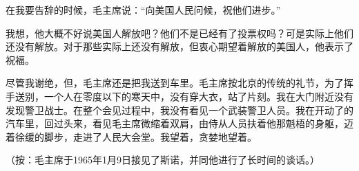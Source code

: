 在我要告辞的时候，毛主席说：“向美国人民问候，祝他们进步。”

我想，他大概不好说美国人解放吧？他们不是已经有了投票权吗？可是实际上他们还没有解放。对于那些实际上还没有解放，但衷心期望着解放的美国人，他表示了祝福。

尽管我谢绝，但，毛主席还是把我送到车里。毛主席按北京的传统的礼节，为了挥手送别，一个人在零度以下的寒天中，没有穿大衣，站了片刻。我在大门附近没有发现警卫战士。在整个会见过程中，我没有看见一个武装警卫人员。我在开动了的汽车里，回过头来，看见毛主席微缩着双肩，由侍从人员扶着他那魁梧的身躯，迈着徐缓的脚步，走进了人民大会堂。我望着，贪婪地望着。

（按：毛主席于1965年1月9日接见了斯诺，并同他进行了长时间的谈话。）



